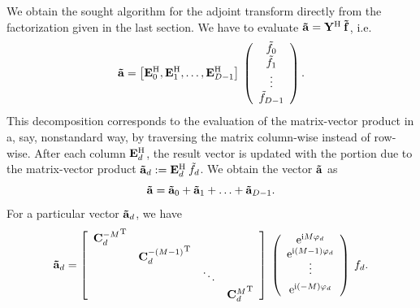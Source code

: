 We obtain the sought algorithm for the adjoint transform directly from the factorization 
given in the last section. We have to evaluate $\mathbf{\tilde{a}} = \mathbf{Y}^{\text{\rm{H}}} \: \mathbf{\tilde{f}}$, i.e.
\begin{equation}
  \label{NFSFT:adjointNDSFTFactorization2}
  \mathbf{\tilde{a}}
  =
  \left[
    \mathbf{E}_{0}^{\text{\rm{H}}},
    \mathbf{E}_{1}^{\text{\rm{H}}},
    \ldots,
    \mathbf{E}_{D-1}^{\text{\rm{H}}}
  \right]
  \:
  \left(\begin{array}{c}
    \tilde{f}_{0}\\
    \tilde{f}_{1}\\
    \vdots\\
    \tilde{f}_{D-1}
  \end{array}\right). 
\end{equation}
This decomposition corresponds to the evaluation of the matrix-vector product in a, say, nonstandard 
way, by traversing the 
matrix column-wise instead of row-wise. After each column $\mathbf{E}_{d}^{\text{\rm{H}}}$, the result vector is updated with the portion due 
to the matrix-vector product $\mathbf{\tilde{a}}_{d} := \mathbf{E}^{\text{\rm{H}}}_{d} \: \tilde{f}_{d}$. We obtain the vector $\mathbf{\tilde{a}}$ as
\begin{equation}
  \label{}
  \mathbf{\tilde{a}} = \mathbf{\tilde{a}}_{0} + \mathbf{\tilde{a}}_{1} + \ldots + \mathbf{\tilde{a}}_{D-1}.
\end{equation}
For a particular vector $\mathbf{\tilde{a}}_{d}$, we have
\begin{equation}
  \label{NFSFT:adjointNDSFTFactorization}
  \mathbf{\tilde{a}}_{d}
  =
  \left[\begin{array}{cccc}
    {\mathbf{C}^{-M}_{d}}^{\text{\rm{T}}} &                               &        &                           \\
                              & {\mathbf{C}^{-(M-1)}_{d}}^{\text{\rm{T}}} &        &                           \\
                              &                                & \ddots &                           \\
                              &                                &        & {\mathbf{C}^{M}_{d}}^{\text{\rm{T}}} 
  \end{array}\right]
  \:
  \left(\begin{array}{c}
    \mbox{\rm{e}}^{\mbox{\scriptsize\rm{i}} M \varphi_{d}}\\
    \mbox{\rm{e}}^{\mbox{\scriptsize\rm{i}} (M-1) \varphi_{d}}\\[-1ex]
    \vdots\\[1ex]
    \mbox{\rm{e}}^{\mbox{\scriptsize\rm{i}} (-M) \varphi_{d}}
  \end{array}\right)
  \:
  f_{d}.
\end{equation}
